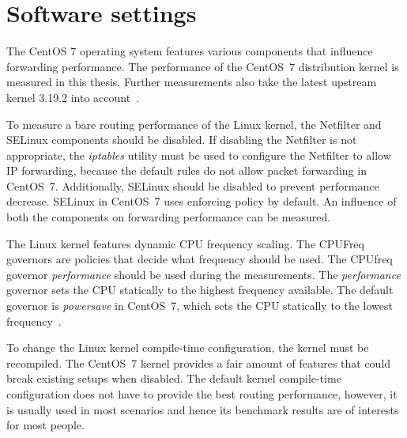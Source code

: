 
\section{Software settings}\label{sec:analysis-settings}
The CentOS 7 operating system features various components that influence forwarding performance.
The performance of the CentOS~7 distribution kernel is measured in this thesis.
Further measurements also take the latest upstream kernel 3.19.2 into account~\cite{kernel-source}.

To measure a bare routing performance of the Linux kernel,
the Netfilter and SELinux components should be disabled.
If disabling the Netfilter is not appropriate,
the {\it{iptables}} utility must be used to configure the Netfilter to allow IP forwarding,
because the default rules do not allow packet forwarding in CentOS~7.
Additionally, SELinux should be disabled to prevent performance decrease.
SELinux in CentOS~7 uses enforcing policy by default.
An influence of both the components on forwarding performance can be measured.

The Linux kernel features dynamic CPU frequency scaling.
The CPUFreq governors are policies that decide what frequency should be used.
The CPUfreq governor {\it{performance}} should be used during the measurements.
The {\it{performance}} governor sets the CPU statically to the
highest frequency available. %
The default governor is {\it{powersave}} in CentOS~7,
which sets the CPU statically to the lowest frequency~\cite{cpufreq-governors}.

To change the Linux kernel compile-time configuration, the kernel must be recompiled.
The CentOS~7 kernel provides a fair amount of features that could break existing setups when disabled.
The default kernel compile-time configuration does not have to provide the best routing performance,
however, it is usually used in most scenarios and hence its benchmark results are of interests for most people.









